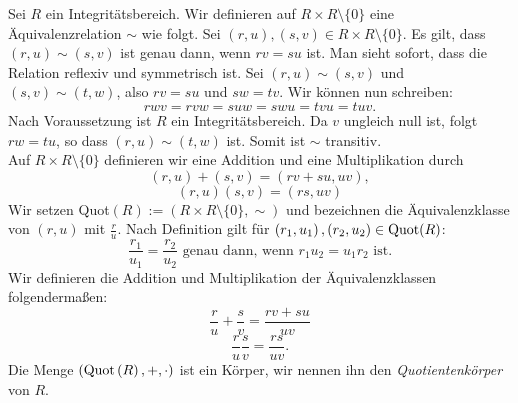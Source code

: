 
\begin{satz}\label{quotkoerper} %
Sei $R$ ein Integritätsbereich. Wir definieren auf $R\times R\setminus\lbrace 0\rbrace$ eine Äquivalenzrelation $\sim$ wie folgt. Sei $\left(r, u\right), \left(s, v\right) \in R\times R\setminus\lbrace 0\rbrace$. Es gilt, dass $\left(r,u\right) \sim \left(s, v\right)$ ist genau dann, wenn $rv = su$ ist. Man sieht sofort, dass die Relation reflexiv und symmetrisch ist. Sei $\left(r,u\right) \sim \left(s, v\right)$ und $ \left(s, v\right) \sim \left(t, w\right) $, also $rv = su$ und $sw = tv$. Wir können nun schreiben: \\
\[rwv = rvw = suw = swu = tvu = tuv.\]
Nach Voraussetzung ist $R$ ein Integritätsbereich. Da $v$ ungleich null ist, folgt $rw = tu$, so dass $\left(r,u \right) \sim \left(t, w\right)$ ist. Somit ist $\sim$ transitiv. \\
Auf $R\times R\setminus \lbrace 0\rbrace$ definieren wir eine Addition und eine Multiplikation durch 
\[\left(r,u\right)+ \left(s,v\right) = \left(rv + su, uv\right),\]
\[\left(r,u\right)\left(s,v\right) = \left(rs, uv\right)\] 
Wir setzen \textup{Quot}$(R) := \left(R\times R\setminus\lbrace 0\rbrace , \sim\right)$ und bezeichnen die Äquivalenzklasse von $(r,u) $ mit $\frac{r}{u}$. Nach Definition gilt für $\left(r_1, u_1\right), \left(r_2, u_2\right) \in \textup{Quot}(R)$:
\[ \frac{r_1}{u_1} = \frac{r_2}{u_2} \text{ genau dann, wenn } r_1u_2 = u_1r_2 \text{ ist.}
\]
Wir definieren die Addition und Multiplikation der Äquivalenzklassen folgendermaßen: 
\[\frac{r}{u} + \frac{s}{v} = \frac{rv + su}{uv}\]
\[\frac{r}{u}\frac{s}{v} = \frac{rs}{uv}.\]
Die Menge $\left(\textup{Quot}\left(R\right), +, \cdot\right)$ ist ein Körper, wir nennen ihn den \textit{Quotientenkörper} von $R$.
\end{satz}
